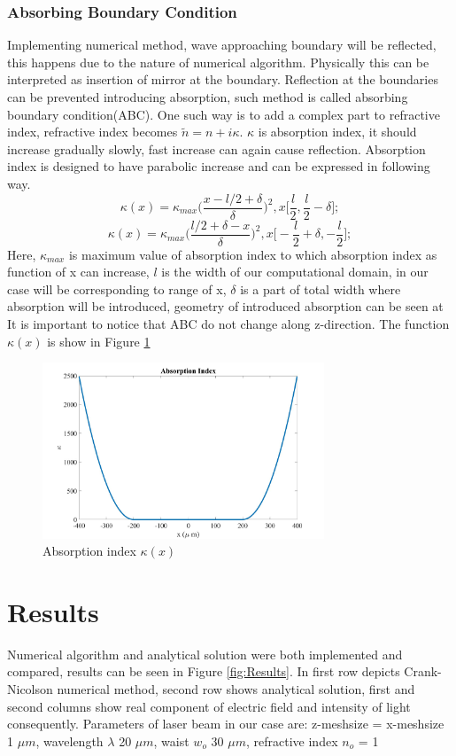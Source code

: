 \documentclass{article}
\begin{document}
	\subsubsection{Absorbing Boundary Condition}
	Implementing numerical method, wave approaching boundary will be reflected, this happens due to the nature of numerical algorithm. Physically this can be interpreted as insertion of mirror at the boundary. Reflection at the boundaries can be prevented introducing absorption, such method is called absorbing boundary condition(ABC). One such way is to add a complex part to refractive index, refractive index becomes $\tilde{n} = n+i\kappa$. $\kappa$  is absorption index, it should increase gradually slowly, fast increase can again cause reflection. Absorption index is designed to have parabolic increase and can be expressed in following way.
	\[\kappa(x)=\kappa_{max}\bigg(\frac{x-l/2+\delta}{\delta}\bigg)^2, x\bigg[\frac{l}{2},\frac{l}{2}-\delta\bigg];\]
	\[\kappa(x)=\kappa_{max}\bigg(\frac{l/2+\delta-x}{\delta}\bigg)^2, x\bigg[-\frac{l}{2}+\delta,-\frac{l}{2}\bigg];\]
	Here, $\kappa_{max}$ is maximum value of absorption index to which absorption index as function of x can increase, $l$ is the width of our computational domain, in our case will be corresponding to range of x, $\delta$ is a part of total width where absorption will be introduced, geometry of introduced absorption can be seen at 
	It is important to notice that ABC do not change along z-direction. The function $\kappa (x)$ is show in Figure \ref{fig:Absorption}
	\begin{figure}[h!]
		\hspace{+10mm}
		\includegraphics[width=0.75\textwidth]{N2.jpg}
		\caption{\label{fig:Absorption}Absorption index $\kappa (x)$}
	\end{figure}
	
	

	\newpage
	\section{Results}
	Numerical algorithm and analytical solution were both implemented and compared, results can be seen in Figure \ref{fig:Results}. In first row depicts Crank-Nicolson numerical method, second row shows analytical solution, first and second columns show real component of electric field and intensity of light consequently. Parameters of laser beam in our case are: z-meshsize = x-meshsize 1 $\mu m$, wavelength $\lambda$ 20 $\mu m$, waist $w_o$ 30 $\mu m$, refractive index $n_o$ = 1 
	
\end{document}
